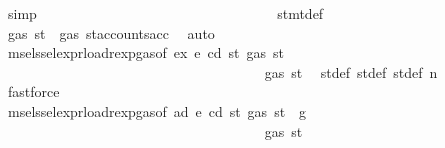 \begin{isabellebody}
\ simp\isanewline
\ \ \ \ \ \ \ \ \ \ \ \ \ \ \ \ \ \ \ \ \ \ \ \ \ \ \ \ \ \ \ \ \isamarkupfalse%
\ stmt{\isacharunderscore}{\kern0pt}def\ \isamarkupfalse%
\ {\isachardoublequoteopen}gas\ st{}{\isacharprime}{\kern0pt}\ {\isacharequal}{\kern0pt}\ gas\ {\isacharparenleft}{\kern0pt}st{\isacharprime}{\kern0pt}{\isacharprime}{\kern0pt}{\isacharprime}{\kern0pt}{\isasymlparr}accounts{\isacharcolon}{\kern0pt}{\isacharequal}{\kern0pt}acc{\isasymrparr}{\isacharparenright}{\kern0pt}{\isachardoublequoteclose}\ \isamarkupfalse%
\ auto\isanewline
\ \ \ \ \ \ \ \ \ \ \ \ \ \ \ \ \ \ \ \ \ \ \ \ \ \ \ \ \ \ \ \ \isamarkupfalse%
\ \isamarkupfalse%
\ msel{\isacharunderscore}{\kern0pt}ssel{\isacharunderscore}{\kern0pt}expr{\isacharunderscore}{\kern0pt}load{\isacharunderscore}{\kern0pt}rexp{\isacharunderscore}{\kern0pt}gas{\isacharparenleft}{\kern0pt}{}{\isacharparenright}{\kern0pt}{\isacharbrackleft}{\kern0pt}of\ ex\ e\ cd\ st{\isacharprime}{\kern0pt}{\isacharprime}{\kern0pt}\ {\isachardoublequoteopen}gas\ st{\isacharprime}{\kern0pt}{\isacharprime}{\kern0pt}{\isachardoublequoteclose}{\isacharbrackright}{\kern0pt}\isanewline
\ \ \ \ \ \ \ \ \ \ \ \ \ \ \ \ \ \ \ \ \ \ \ \ \ \ \ \ \ \ \ \ \ \ \isamarkupfalse%
\ {\isachardoublequoteopen}{\isasymdots}\ {\isasymle}\ gas\ st{\isacharprime}{\kern0pt}{\isacharprime}{\kern0pt}{\isachardoublequoteclose}\ \isamarkupfalse%
\ st{\isacharprime}{\kern0pt}{\isacharunderscore}{\kern0pt}def\ st{\isacharprime}{\kern0pt}{\isacharprime}{\kern0pt}{\isacharunderscore}{\kern0pt}def\ st{\isacharprime}{\kern0pt}{\isacharprime}{\kern0pt}{\isacharprime}{\kern0pt}{\isacharunderscore}{\kern0pt}def\ n{}\ \isamarkupfalse%
\ fastforce\isanewline
\ \ \ \ \ \ \ \ \ \ \ \ \ \ \ \ \ \ \ \ \ \ \ \ \ \ \ \ \ \ \ \ \isamarkupfalse%
\ \isamarkupfalse%
\ msel{\isacharunderscore}{\kern0pt}ssel{\isacharunderscore}{\kern0pt}expr{\isacharunderscore}{\kern0pt}load{\isacharunderscore}{\kern0pt}rexp{\isacharunderscore}{\kern0pt}gas{\isacharparenleft}{\kern0pt}{}{\isacharparenright}{\kern0pt}{\isacharbrackleft}{\kern0pt}of\ ad\ e\ cd\ st{\isacharprime}{\kern0pt}\ {\isachardoublequoteopen}gas\ st\ {\isacharminus}{\kern0pt}\ g{\isachardoublequoteclose}{\isacharbrackright}{\kern0pt}\isanewline
\ \ \ \ \ \ \ \ \ \ \ \ \ \ \ \ \ \ \ \ \ \ \ \ \ \ \ \ \ \ \ \ \ \ \isamarkupfalse%
\ {\isachardoublequoteopen}{\isasymdots}\ {\isasymle}\ gas\ st{\isacharprime}{\kern0pt}{\isachardoublequoteclose}\ \isamarkupfalse%

\end{isabellebody}
